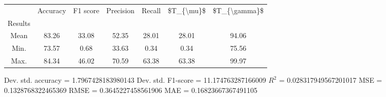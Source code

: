 \begin{tabular}{|c|c|c|c|c|c|c|}
\toprule
{} &  Accuracy &  F1 score &  Precision &  Recall &  \$T\_\{\textbackslash mu\}\$ &  \$T\_\{\textbackslash gamma\}\$ \\
Results &           &           &            &         &            &               \\
\hline
Mean    &     83.26 &     33.08 &      52.35 &   28.01 &      28.01 &         94.06 \\
Min.    &     73.57 &      0.68 &      33.63 &    0.34 &       0.34 &         75.56 \\
Max.    &     84.34 &     46.02 &      70.59 &   63.38 &      63.38 &         99.97 \\
\bottomrule
\end{tabular}

 Dev. std. accuracy = 1.7967428183980143
 Dev. std. F1-score = 11.174763287166009
 $R^2$ = 0.028317949567201017
 MSE = 0.1328768322465369
 RMSE = 0.3645227458561906
 MAE = 0.16823667367491105